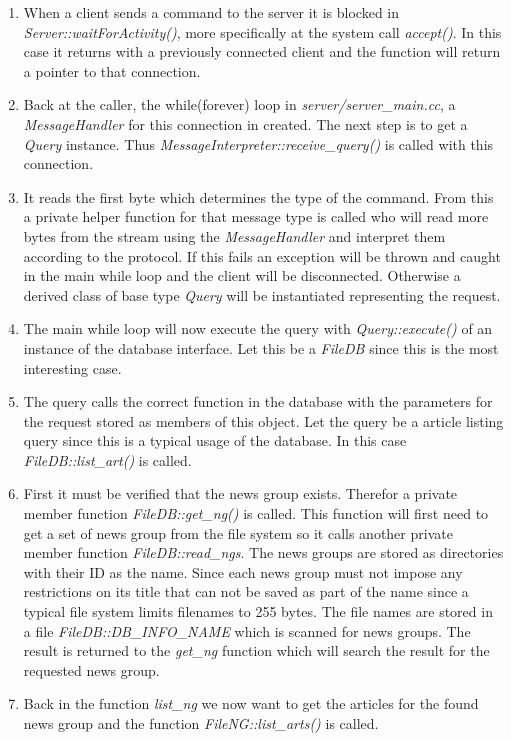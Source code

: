 \documentclass[10pt, a4paper]{article}
\begin{document}
\begin{enumerate}
	\item When a client sends a command to the server it is blocked in \emph{Server::waitForActivity()}, more specifically at the system call \emph{accept()}. In this case it returns with a previously connected client and the function will return a pointer to that connection.
	\item Back at the caller, the while(forever) loop in \emph{server/server\_main.cc}, a \emph{MessageHandler} for this connection in created. The next step is to get a \emph{Query} instance. Thus \emph{MessageInterpreter::receive\_query()} is called with this connection.
	\item It reads the first byte which determines the type of the command. From this a private helper function for that message type is called who will read more bytes from the stream using the \emph{MessageHandler} and interpret them according to the protocol. If this fails an exception will be thrown and caught in the main while loop and the client will be disconnected. Otherwise a derived class of base type \emph{Query} will be instantiated representing the request.
	\item The main while loop will now execute the query with \emph{Query::execute()} of an instance of the database interface. Let this be a \emph{FileDB} since this is the most interesting case.
	\item The query calls the correct function in the database with the parameters for the request stored as members of this object. Let the query be a article listing query since this is a typical usage of the database. In this case \emph{FileDB::list\_art()} is called.
	\item First it must be verified that the news group exists. Therefor a private member function \emph{FileDB::get\_ng()} is called. This function will first need to get a set of news group from the file system so it calls another private member function \emph{FileDB::read\_ngs}. The news groups are stored as directories with their ID as the name. Since each news group must not impose any restrictions on its title that can not be saved as part of the name since a typical file system limits filenames to 255 bytes. The file names are stored in a file \emph{FileDB::DB\_INFO\_NAME} which is scanned for news groups. The result is returned to the \emph{get\_ng} function which will search the result for the requested news group.
	\item Back in the function \emph{list\_ng} we now want to get the articles for the found news group and the function \emph{FileNG::list\_arts()} is called.

\end{enumerate}
\end{document}
